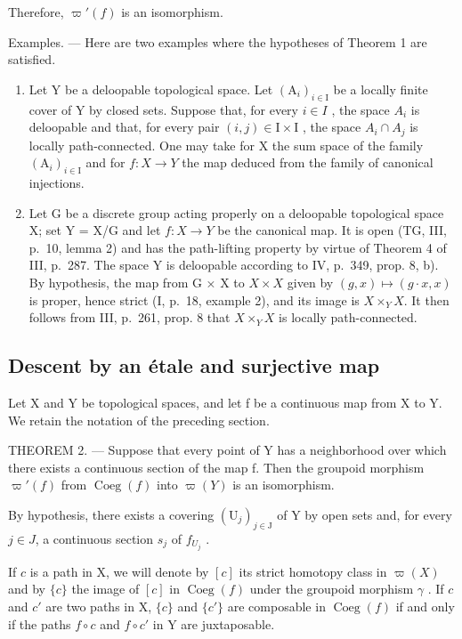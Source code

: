 Therefore, \(\varpi'(f)\) is an isomorphism.

Examples. --- Here are two examples where the hypotheses of Theorem 1 are satisfied.

\begin{enumerate}
\def\labelenumi{\arabic{enumi})}
\item
  Let Y be a deloopable topological space. Let \((\mathrm{A}_{i})_{i\in\mathrm{I}}\) be a locally finite cover of Y by closed sets. Suppose that, for every \(i\in I\) , the space \(A_{i}\) is deloopable and that, for every pair \((i,j)\in\mathrm{I}\times\mathrm{I}\) , the space \(A_{i}\cap A_{j}\) is locally path-connected. One may take for X the sum space of the family \((\mathrm{A}_{i})_{i\in\mathrm{I}}\) and for \(f:X\to Y\) the map deduced from the family of canonical injections.
\item
  Let G be a discrete group acting properly on a deloopable topological space X; set Y = X/G and let \(f: X \to Y\) be the canonical map. It is open (TG, III, p.~10, lemma 2) and has the path-lifting property by virtue of Theorem 4 of III, p.~287. The space Y is deloopable according to IV, p.~349, prop. 8, b). By hypothesis, the map from G × X to \(X\times X\) given by \((g, x) \mapsto (g \cdot x, x)\) is proper, hence strict (I, p.~18, example 2), and its image is \(X\times_{Y}X\). It then follows from III, p.~261, prop. 8 that \(X\times_{Y}X\) is locally path-connected.
\end{enumerate}

\subsection{Descent by an étale and surjective map}

Let X and Y be topological spaces, and let f be a continuous map from X to Y. We retain the notation of the preceding section.

THEOREM 2. --- Suppose that every point of Y has a neighborhood over which there exists a continuous section of the map f. Then the groupoid morphism \(\varpi'(f)\) from \(\operatorname{Coeg}(f)\) into \(\varpi(Y)\) is an isomorphism.

By hypothesis, there exists a covering \((\mathrm{U}_{j})_{j\in\mathrm{J}}\) of Y by open sets and, for every \(j\in J\), a continuous section \(s_{j}\) of \(f_{U_{j}}\) .

If \(c\) is a path in X, we will denote by \([c]\) its strict homotopy class in \(\varpi(X)\) and by \(\{c\}\) the image of \([c]\) in \(\operatorname{Coeg}(f)\) under the groupoid morphism \(\gamma\) . If \(c\) and \(c'\) are two paths in X, \(\{c\}\) and \(\{c'\}\) are composable in \(\operatorname{Coeg}(f)\) if and only if the paths \(f \circ c\) and \(f \circ c'\) in Y are juxtaposable.

